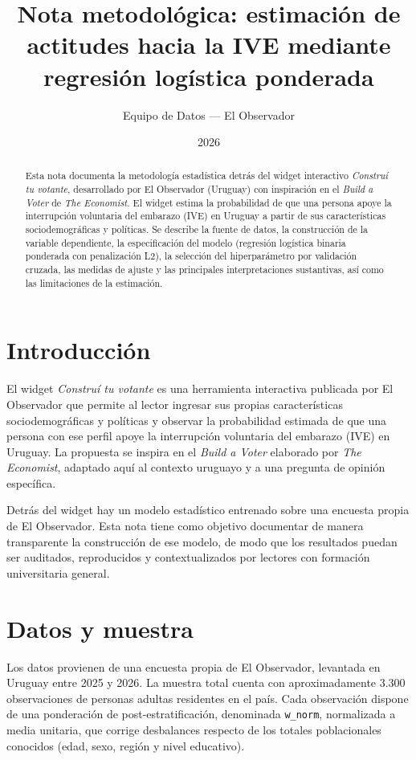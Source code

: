 \documentclass[11pt,a4paper]{article}
\title{Nota metodológica: estimación de actitudes hacia la IVE mediante regresión logística ponderada}
\author{Equipo de Datos --- El Observador}
\date{2026}
\begin{document}
\maketitle

\begin{abstract}
\noindent Esta nota documenta la metodología estadística detrás del widget interactivo \emph{Construí tu votante}, desarrollado por El Observador (Uruguay) con inspiración en el \emph{Build a Voter} de \textit{The Economist}. El widget estima la probabilidad de que una persona apoye la interrupción voluntaria del embarazo (IVE) en Uruguay a partir de sus características sociodemográficas y políticas. Se describe la fuente de datos, la construcción de la variable dependiente, la especificación del modelo (regresión logística binaria ponderada con penalización L2), la selección del hiperparámetro por validación cruzada, las medidas de ajuste y las principales interpretaciones sustantivas, así como las limitaciones de la estimación.
\end{abstract}

\section{Introducción}

El widget \emph{Construí tu votante} es una herramienta interactiva publicada por El Observador que permite al lector ingresar sus propias características sociodemográficas y políticas y observar la probabilidad estimada de que una persona con ese perfil apoye la interrupción voluntaria del embarazo (IVE) en Uruguay. La propuesta se inspira en el \emph{Build a Voter} elaborado por \textit{The Economist}, adaptado aquí al contexto uruguayo y a una pregunta de opinión específica.

Detrás del widget hay un modelo estadístico entrenado sobre una encuesta propia de El Observador. Esta nota tiene como objetivo documentar de manera transparente la construcción de ese modelo, de modo que los resultados puedan ser auditados, reproducidos y contextualizados por lectores con formación universitaria general.

\section{Datos y muestra}

Los datos provienen de una encuesta propia de El Observador, levantada en Uruguay entre 2025 y 2026. La muestra total cuenta con aproximadamente 3.300 observaciones de personas adultas residentes en el país. Cada observación dispone de una ponderación de post-estratificación, denominada \texttt{w\_norm}, normalizada a media unitaria, que corrige desbalances respecto de los totales poblacionales conocidos (edad, sexo, región y nivel educativo).
\end{document}

